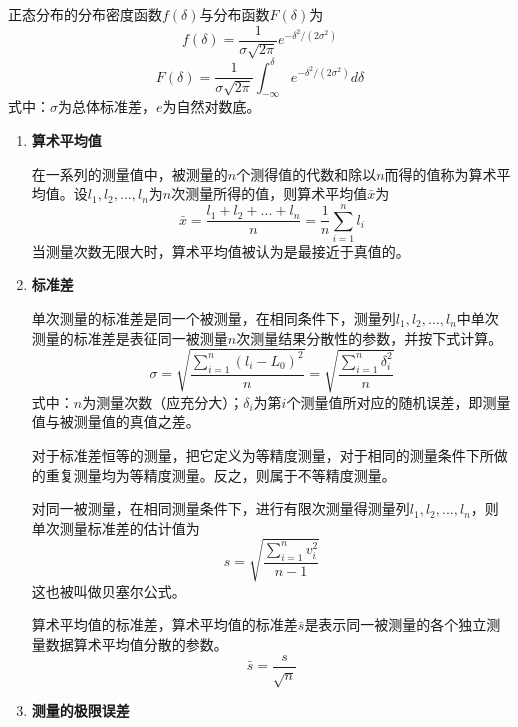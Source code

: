 正态分布的分布密度函数$ f(\delta) $与分布函数$ F(\delta) $为
\begin{equation}
	f(\delta)=\frac{1}{\sigma\sqrt{2\pi}}e^{-\delta^2/(2\sigma^2)}
\end{equation}
\begin{equation}
F(\delta)=\frac{1}{\sigma\sqrt{2\pi}}\int_{-\infty}^{\delta}e^{-\delta^2/(2\sigma^2)}d\delta
\end{equation}
式中：$ \sigma $为总体标准差，$ e $为自然对数底。
\begin{enumerate}
	\item \textbf{算术平均值}
	
	\qquad 在一系列的测量值中，被测量的$ n $个测得值的代数和除以$ n $而得的值称为算术平均值。设$ l_1,l_2,...,l_n $为$ n $次测量所得的值，则算术平均值$ \bar{x} $为
	\begin{equation}
	\bar{x}=\frac{l_1+l_2+...+l_n}{n}=\frac{1}{n}\sum_{i=1}^{n}l_i
	\end{equation}
	当测量次数无限大时，算术平均值被认为是最接近于真值的。
	\item \textbf{标准差}
	
	\qquad 单次测量的标准差是同一个被测量，在相同条件下，测量列$ l_1,l_2,...,l_n $中单次测量的标准差是表征同一被测量$ n $次测量结果分散性的参数，并按下式计算。
	\begin{equation}
	\sigma=\sqrt{\frac{\sum\limits_{i=1}^{n}(l_i-L_0)^2}{n}}=\sqrt{\frac{\sum\limits_{i=1}^{n}\delta_i^2}{n}}
	\end{equation}
	式中：$ n $为测量次数（应充分大）；$ \delta_i $为第$ i $个测量值所对应的随机误差，即测量值与被测量值的真值之差。
	
	\qquad 对于标准差恒等的测量，把它定义为等精度测量，对于相同的测量条件下所做的重复测量均为等精度测量。反之，则属于不等精度测量。
	
	\qquad 对同一被测量，在相同测量条件下，进行有限次测量得测量列$ l_1,l_2,...,l_n $，则单次测量标准差的估计值为
	\begin{equation}
	s=\sqrt{\frac{\sum\limits_{i=1}^{n}v_i^2}{n-1}}
	\end{equation}
	这也被叫做贝塞尔公式。
	
	\qquad 算术平均值的标准差，算术平均值的标准差$ \bar{s} $是表示同一被测量的各个独立测量数据算术平均值分散的参数。
	\begin{equation}
	\bar{s}=\frac{s}{\sqrt{n}}
	\end{equation}
	\item \textbf{测量的极限误差}
	

\end{enumerate}
